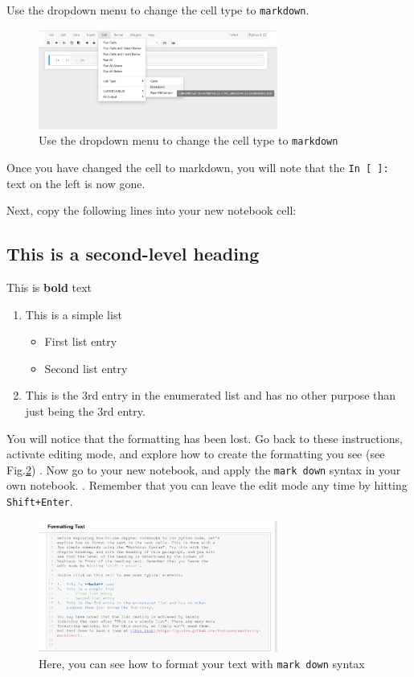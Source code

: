 \documentclass[svgnames, 11pt, lettersize]{article}
\begin{document}
Use the dropdown menu to change the cell type to \texttt{markdown}.
\begin{figure}[htbp]
\centering
\includegraphics[width=0.7\textwidth]{./figures/Screenshot_20200527_150324.png}
\caption{\label{celltype}Use the dropdown menu to change the cell type to \texttt{markdown}}
\end{figure}


Once you have changed the cell to markdown, you will note that the \texttt{In
[ ]:} text on the left is now gone.

Next, copy the following lines into your new notebook cell:
\subsection{This is a second-level heading}
\label{sec:org7b00dee}

This is \textbf{bold} text

\begin{enumerate}
\item This is a simple list
\begin{itemize}
\item First list entry
\item Second list entry
\end{itemize}
\item This is the 3rd entry in the enumerated list and has no other
purpose than just being the 3rd entry.
\end{enumerate}

You will notice that the formatting has been lost. Go back to these
instructions, activate editing mode, and explore how to create the
formatting you see (see Fig.\ref{mdsyntax}) . Now go to your new
notebook, and apply the \texttt{mark down} syntax in your own notebook.
. Remember that you can leave the
edit mode any time by hitting \texttt{Shift+Enter}.

\begin{figure}[htbp]
\centering
\includegraphics[width=0.7\textwidth]{./figures/Screenshot_20200527_153811.png}
\caption{\label{mdsyntax}Here, you can see how to format your text with \texttt{mark down} syntax}
\end{figure}
\end{document}
